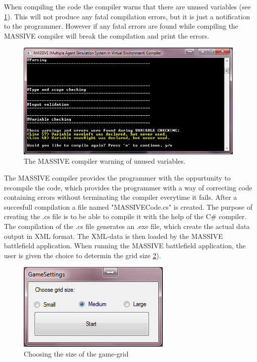 When compiling the code the compiler warns that there are unused variables (see \ref{fig:compiler}). This will not produce any fatal compilation errors, but it is just a notification to the programmer. However if any fatal errors are found while compiling the MASSIVE compiler will break the compilation and print the errors.


\begin{figure}[h]%
\begin{center}
\includegraphics[scale=0.6]{Images/compiler.png}%
\end{center}
\caption{The MASSIVE compiler warning of unused variables.}%
\label{fig:compiler}%
\end{figure}

The MASSIVE compiler provides the programmer with the oppurtunity to recompile the code, which provides the programmer with a way of correcting code containing errors without terminating the compiler everytime it fails. After a succesfull compilation a file named "MASSIVECode.cs" is created. The purpose of creating the .cs file is to be able to compile it with the help of the C\# compiler. The compilation of the .cs file generates an .exe file, which create the actual data output in XML format. The XML-data is then loaded by the MASSIVE battlefield application. When running the MASSIVE battlefield application, the user is given the choice to determin the grid size \ref{fig:game_promt}).

\begin{figure}[h]%
\begin{center}
\includegraphics[scale=0.6]{images/massive_dialog.png}%
\end{center}
\caption{Choosing the size of the game-grid}%
\label{fig:game_promt}%
\end{figure}


